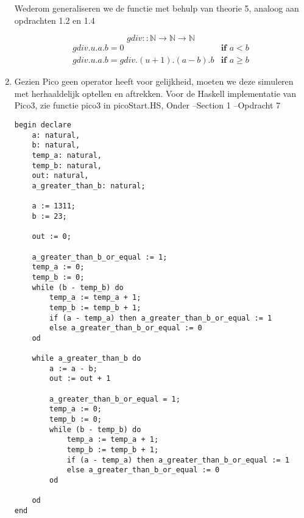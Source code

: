 \documentclass[12pt]{article}
\newcommand{\N}{\mathbb{N}}
\begin{document}
\begin{enumerate}
        Wederom generaliseren we de functie met behulp van theorie 5, analoog aan opdrachten 1.2 en 1.4

        \begin{equation}
            gdiv :: \N \rightarrow \N \rightarrow \N 
        \end{equation}
        \begin{displaymath}
        \begin{array}{ll}
        gdiv.u.a.b = 0 & \textbf{if } a < b\\
        gdiv.u.a.b = gdiv.(u+1).(a-b).b & \textbf{if } a \geq b
        \end{array}
        \end{displaymath}

    \item Gezien Pico geen operator heeft voor gelijkheid, moeten we deze simuleren met herhaaldelijk optellen en aftrekken. Voor de Haskell implementatie van Pico3, zie functie pico3 in picoStart.HS, Onder --Section 1 --Opdracht 7
        
        \begin{verbatim}
begin declare
    a: natural,
    b: natural,
    temp_a: natural,
    temp_b: natural,
    out: natural,
    a_greater_than_b: natural;
    
    a := 1311;
    b := 23;
    
    out := 0;
    
    a_greater_than_b_or_equal := 1;
    temp_a := 0;
    temp_b := 0;
    while (b - temp_b) do
        temp_a := temp_a + 1;
        temp_b := temp_b + 1;
        if (a - temp_a) then a_greater_than_b_or_equal := 1
        else a_greater_than_b_or_equal := 0
    od
        
    while a_greater_than_b do
        a := a - b;
        out := out + 1
        
        a_greater_than_b_or_equal = 1;
        temp_a := 0;
        temp_b := 0;
        while (b - temp_b) do
            temp_a := temp_a + 1;
            temp_b := temp_b + 1;
            if (a - temp_a) then a_greater_than_b_or_equal := 1
            else a_greater_than_b_or_equal := 0 
        od
        
    od    
end
        \end{verbatim}
\end{enumerate}    
        
        
\end{document}

